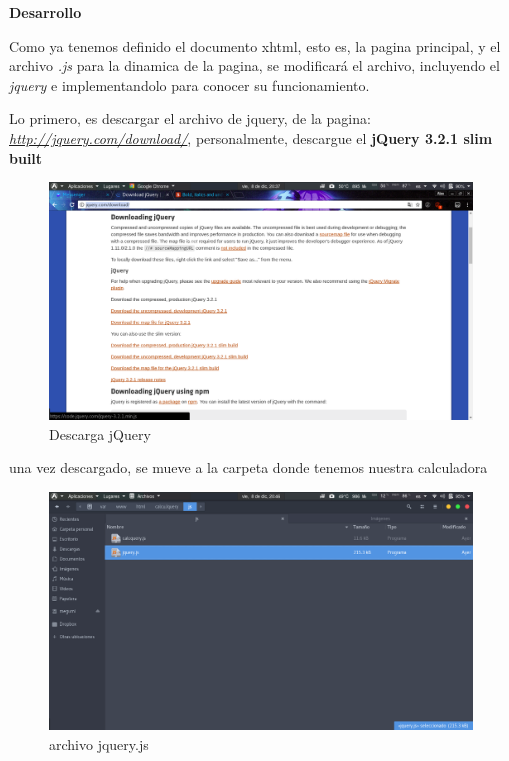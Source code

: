\documentclass[12pt,letterpaper]{article}
\begin{document}
\newpage
{\Huge {\rm {\bf Desarrollo}}}
\begin{flushleft}

Como ya tenemos definido el documento xhtml, esto es, la pagina principal, y el archivo {\em .js} para la dinamica de la pagina, se modificar\'a el archivo, incluyendo el {\em jquery} e implementandolo para conocer su funcionamiento.

\vspace{2mm}

Lo primero, es descargar el archivo de jquery, de la pagina: {\em {\underline {http://jquery.com/download/}}}, personalmente, descargue el {\bf jQuery 3.2.1 slim built}


\begin{figure}[H]%
\begin{minipage}[t]{12cm}
\includegraphics[width=400pt]{./imgs/1.png}
\caption{Descarga jQuery}\label{figura 1}
\end{minipage}
\end{figure}


\vspace{2mm}


una vez descargado, se mueve a la carpeta donde tenemos nuestra calculadora 


\begin{figure}[H]
\begin{minipage}[t]{12cm}
\includegraphics[width=400pt]{./imgs/2.png}
\caption{archivo jquery.js}\label{figura 2}
\end{minipage}
\end{figure}



\end{flushleft}
\end{document}

